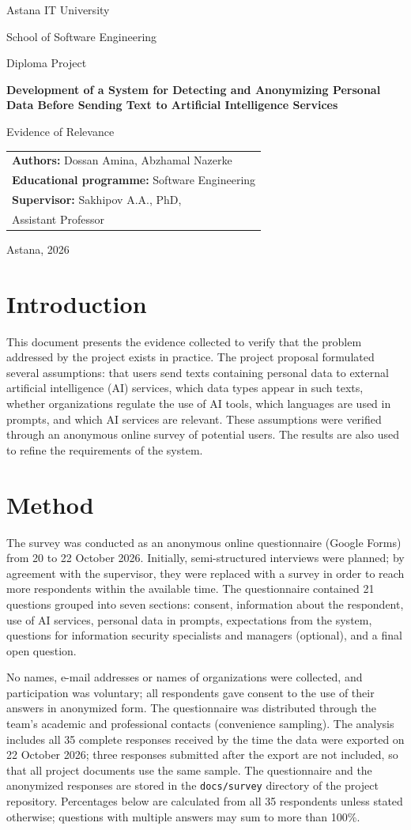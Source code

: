 \documentclass[12pt,a4paper]{article}
\makeatletter
\newcommand{\maketitlepage}[1]{%
\begin{titlepage}
\centering
{\large Astana IT University\par}
{\normalsize School of Software Engineering\par}
\vspace{4.5cm}
{\normalsize Diploma Project\par}
\vspace{0.6cm}
{\Large\bfseries Development of a System for Detecting and Anonymizing Personal Data Before Sending Text to Artificial Intelligence Services\par}
\vspace{1.2cm}
{\LARGE #1\par}
\vfill
\begin{flushright}
\begin{tabular}{@{}l@{}}
\textbf{Authors:} Dossan Amina, Abzhamal Nazerke\\
\textbf{Educational programme:} Software Engineering\\
\textbf{Supervisor:} Sakhipov A.A., PhD,\\ \hspace{2.2cm}Assistant Professor
\end{tabular}
\end{flushright}
\vspace{2.5cm}
{\normalsize Astana, 2026\par}
\end{titlepage}
\setcounter{page}{2}}
\makeatother
\begin{document}
\maketitlepage{Evidence of Relevance}

\tableofcontents
\newpage

\section{Introduction}

This document presents the evidence collected to verify that the problem addressed by the project exists in practice. The project proposal formulated several assumptions: that users send texts containing personal data to external artificial intelligence (AI) services, which data types appear in such texts, whether organizations regulate the use of AI tools, which languages are used in prompts, and which AI services are relevant. These assumptions were verified through an anonymous online survey of potential users. The results are also used to refine the requirements of the system.

\section{Method}

The survey was conducted as an anonymous online questionnaire (Google Forms) from 20 to 22 October 2026. Initially, semi-structured interviews were planned; by agreement with the supervisor, they were replaced with a survey in order to reach more respondents within the available time. The questionnaire contained 21 questions grouped into seven sections: consent, information about the respondent, use of AI services, personal data in prompts, expectations from the system, questions for information security specialists and managers (optional), and a final open question.

No names, e-mail addresses or names of organizations were collected, and participation was voluntary; all respondents gave consent to the use of their answers in anonymized form. The questionnaire was distributed through the team's academic and professional contacts (convenience sampling). The analysis includes all 35 complete responses received by the time the data were exported on 22 October 2026; three responses submitted after the export are not included, so that all project documents use the same sample. The questionnaire and the anonymized responses are stored in the \texttt{docs/survey} directory of the project repository. Percentages below are calculated from all 35 respondents unless stated otherwise; questions with multiple answers may sum to more than 100\%.
\end{document}
